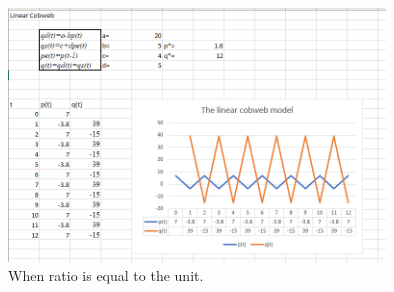 \documentclass[a4paper,12pt]{report}
\begin{document}
\begin{figure}[h]
\caption{When ratio is equal to the unit.}
\centering
 \includegraphics[width=10cm]{CobwebRatio1.PNG}
\end{figure}
\end{document}
